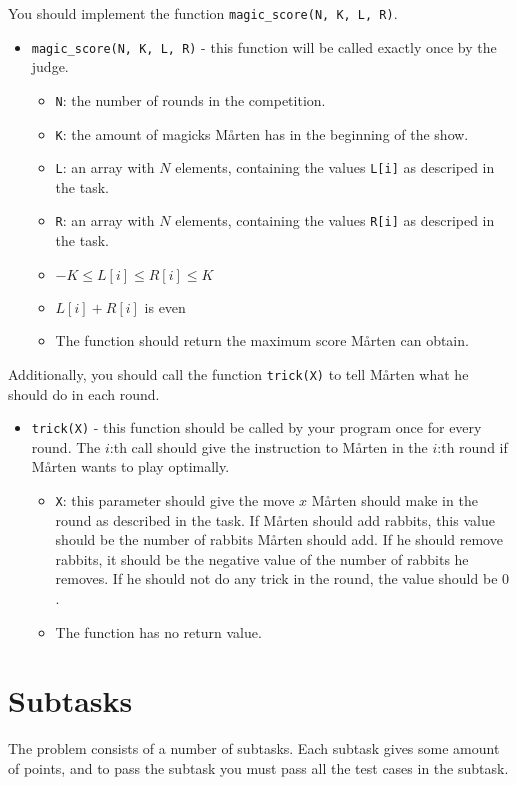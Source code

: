 You should implement the function \texttt{magic\_score(N, K, L, R)}.
\begin{itemize}
  \item \texttt{magic\_score(N, K, L, R)} - this function will be called exactly once by the judge.
  \begin{itemize}
    \item \texttt{N}: the number of rounds in the competition.
    \item \texttt{K}: the amount of magicks Mårten has in the beginning of the show.
    \item \texttt{L}: an array with $N$ elements, containing the values \texttt{L[i]} as descriped in the task.
    \item \texttt{R}: an array with $N$ elements, containing the values \texttt{R[i]} as descriped in the task.
    \item $-K \le L[i] \le R[i] \le K$
    \item $L[i] + R[i]$ is even
    \item The function should return the maximum score Mårten can obtain.
  \end{itemize}

\end{itemize}

Additionally, you should call the function \texttt{trick(X)} to tell Mårten what he should do in each round.
\begin{itemize}
  \item \texttt{trick(X)} - this function should be called by your program once for every round. The $i$:th call should give the instruction
    to Mårten in the $i$:th round if Mårten wants to play optimally.
  \begin{itemize}
    \item \texttt{X}: this parameter should give the move $x$ Mårten should make in the round as described in the task. If Mårten should add rabbits,
      this value should be the number of rabbits Mårten should add. If he should remove rabbits, it should be the negative
      value of the number of rabbits he removes. If he should not do any trick in the round, the value should be $0$. 
    \item The function has no return value.
  \end{itemize}
\end{itemize}


\section*{Subtasks}
The problem consists of a number of subtasks. Each subtask gives some amount of points, and to pass
the subtask you must pass all the test cases in the subtask.

